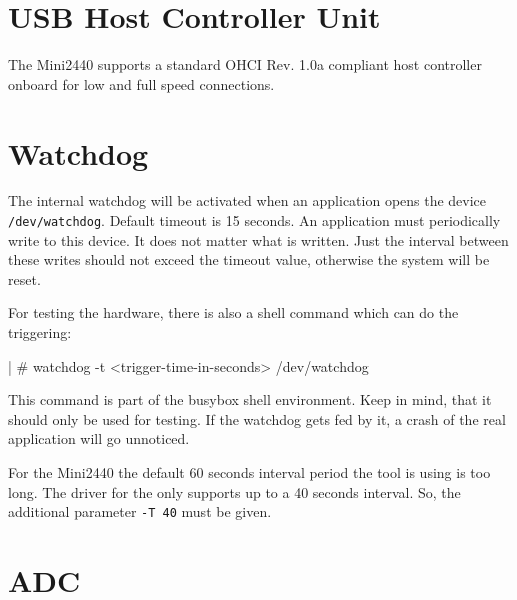 \section{USB Host Controller Unit}			\label{sec:USBHOST}

The Mini2440 supports a standard OHCI Rev. 1.0a compliant host controller
onboard for low and full speed connections.

%
%


\newcommand{\perWatchdogTimeout}{15}

\section{Watchdog}			\label{sec:WD}

The internal watchdog will be activated when an application opens the device
\texttt{/dev/watchdog}. Default timeout is \perWatchdogTimeout{} seconds.
An application must periodically write to this device. It does not matter what
is written. Just the interval between these writes should not exceed the
timeout value, otherwise the system will be reset.

For testing the hardware, there is also a shell command which can do the
triggering:

\begin{ptxshell}{|}
# watchdog -t <trigger-time-in-seconds> /dev/watchdog
\end{ptxshell}

This command is part of the busybox shell environment. Keep in mind, that
it should only be used for testing. If the watchdog gets fed by it, a crash of
the real application will go unnoticed.

For the Mini2440 the default 60 seconds interval period the
tool is using is too long. The driver for the \perCpuName{} only supports up to
a 40 seconds interval. So, the additional parameter \texttt{-T 40} must be
given.


\section{ADC}							\label{sec:ADC}

